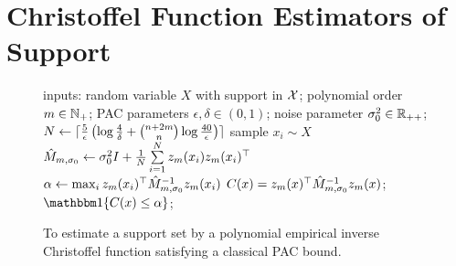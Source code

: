 \documentclass[onefignum,onetabnum]{siamart171218}
\begin{document}
\section{Christoffel Function Estimators of Support}%
\label{sec:christoffel_function_estimators_of_support}

\begin{figure}
    \begin{minipage}[t]{0.46\textwidth}
    \begin{algorithm}[H]
        \caption{To estimate a support set by a polynomial empirical inverse
        Christoffel function satisfying a classical PAC bound.}\label{alg:cfun_classical}
        \begin{algorithmic}
        \STATE inputs: random variable $X$ with support in $\mathcal{X}$; polynomial order $m\in\mathbb{N}_+$; PAC parameters
        $\epsilon,\delta\in(0,1)$; noise parameter $\sigma_0^2\in\mathbb{R}_{++}$;
        \STATE $N\gets \lceil\frac{5}{\epsilon}\left(\log\frac{4}{\delta}+\binom{n+2m}{n}\log\frac{40}{\epsilon}\right)\rceil$
          \STATE sample $x_i\sim X$
        \ENDFOR
        \STATE
        $\hat{M}_{m,\sigma_0}\gets \sigma_0^2I + \frac{1}{N}\sum\limits_{i=1}^N z_m(x_i)z_m(x_i)^\top$
        \STATE
        $\alpha \gets \max_i z_m(x_i)^\top\hat{M}_{m,\sigma_0}^{-1} z_m(x_i)$
        \STATE
        $C(x)=z_m(x)^\top\hat{M}_{m,\sigma_0}^{-1}z_m(x)$;
        \RETURN $\ind{C(x)\le\alpha}$;
        \end{algorithmic}
    \end{algorithm}
\end{minipage}
\end{figure}
\end{document}
